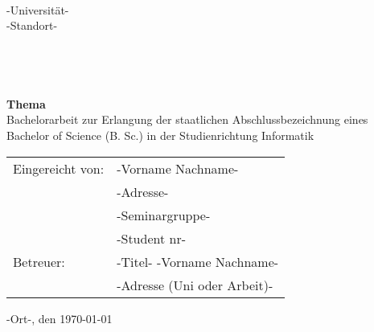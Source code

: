 \thispagestyle{empty}
\onehalfspacing

\begin{verbatim}


\end{verbatim}

\begin{center}
\begin{large}
-Universität-\\
-Standort-
\end{large}
\end{center}

\begin{verbatim}




\end{verbatim}
\begin{center}
\textbf{\Large{Thema}}\\
\vspace{6mm}
\large{Bachelorarbeit \linebreak 
zur Erlangung der staatlichen Abschlussbezeichnung eines \linebreak 
Bachelor of Science (B. Sc.)\linebreak
 in der Studienrichtung Informatik}
\end{center}

\vfill

\begin{flushleft}
\noindent \begin{tabular}{ll}
Eingereicht von: & -Vorname Nachname- \\ 
 & -Adresse- \\ 
 & -Seminargruppe- \\ 
 & -Student nr- \\ 
 Betreuer: & -Titel- -Vorname Nachname- \\
 & -Adresse (Uni oder Arbeit)- \\
 
\end{tabular}
\end{flushleft}
\vspace{10mm}
\noindent  -Ort-, den \today\\

